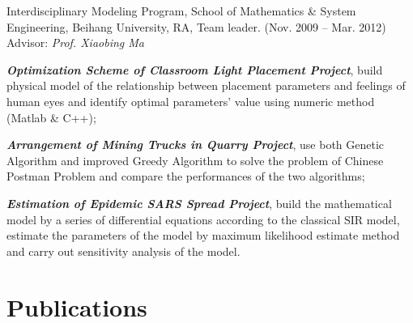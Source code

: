 \documentclass[10pt,letterpaper]{article}
\renewenvironment{itemize}{
\begin{list}{}{
    \setlength{\leftmargin}{1.5em}
    \setlength{\itemsep}{0.25em}
    \setlength{\parskip}{0pt}
    \setlength{\parsep}{0.25em}
    }
    }{
\end{list}
}
\begin{document}
\begin{itemize}
        \item Interdisciplinary Modeling Program, School of Mathematics \& System Engineering, Beihang University, RA, Team leader. (Nov. 2009 -- Mar. 2012) \\
        Advisor: \textit{Prof. Xiaobing Ma}
        \begin{itemize}
            \item \textbf{\textit{Optimization Scheme of Classroom Light Placement Project}}, build physical model of the relationship between placement parameters and feelings of human eyes and identify optimal parameters' value using numeric method (Matlab \& C++);
            \item \textit{\textbf{Arrangement of Mining Trucks in Quarry Project}}, use both Genetic Algorithm and improved Greedy Algorithm to solve the problem of Chinese Postman Problem and compare the performances of the two algorithms;
            \item \textbf{\textit{Estimation of Epidemic SARS Spread Project}}, build the mathematical model by a series of differential equations according to the classical SIR model, estimate the parameters of the model by maximum likelihood estimate method and carry out sensitivity analysis of the model.
        \end{itemize}
    \end{itemize}

    \newpage
    \section*{Publications}
\end{document}
